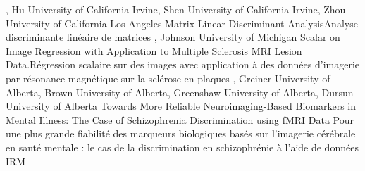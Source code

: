 
{
,  {Hu}
{University of California Irvine},  {Shen}
{University of California Irvine},  {Zhou}
{University of California Los Angeles}
}
{Matrix Linear Discriminant Analysis}{Analyse discriminante linéaire de matrices }
{\bubbleE \enspace \screenE}
{
,  {Johnson}
{University of Michigan}
}
{Scalar on Image Regression with Application to Multiple Sclerosis MRI Lesion Data.}{Régression scalaire sur des images avec application à des données d’imagerie par résonance magnétique sur la sclérose en plaques }
{\bubbleE \enspace \screenE}
{
,  {Greiner}
{University of Alberta},  {Brown}
{University of Alberta},  {Greenshaw}
{University of Alberta},  {Dursun}
{University of Alberta}
}
{Towards More Reliable Neuroimaging-Based Biomarkers in Mental Illness: The Case of Schizophrenia Discrimination using fMRI Data }{Pour une plus grande fiabilité des marqueurs biologiques basés sur l’imagerie cérébrale en santé mentale : le cas de la discrimination en schizophrénie à l’aide de données IRM }
{\bubbleE \enspace \screenE}


